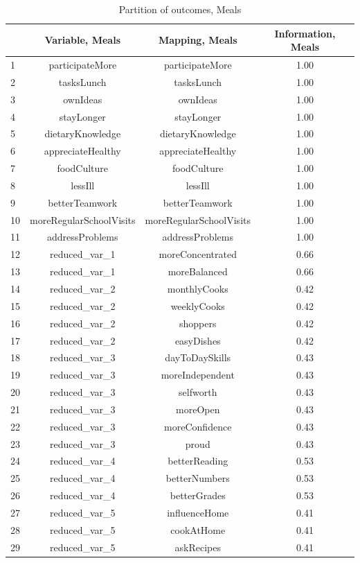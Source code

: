 \documentclass[12pt, a4paper, titlepage]{article}\usepackage[]{graphicx}\usepackage[]{color}
\begin{document}
\begin{table}[ht]
\centering
\begin{tabular}{lccc}
  \hline
 & Variable, Meals & Mapping, Meals & Information, Meals \\ 
  \hline
1 & participateMore & participateMore & 1.00 \\ 
  2 & tasksLunch & tasksLunch & 1.00 \\ 
  3 & ownIdeas & ownIdeas & 1.00 \\ 
  4 & stayLonger & stayLonger & 1.00 \\ 
  5 & dietaryKnowledge & dietaryKnowledge & 1.00 \\ 
  6 & appreciateHealthy & appreciateHealthy & 1.00 \\ 
  7 & foodCulture & foodCulture & 1.00 \\ 
  8 & lessIll & lessIll & 1.00 \\ 
  9 & betterTeamwork & betterTeamwork & 1.00 \\ 
  10 & moreRegularSchoolVisits & moreRegularSchoolVisits & 1.00 \\ 
  11 & addressProblems & addressProblems & 1.00 \\ 
  12 & reduced\_var\_1 & moreConcentrated & 0.66 \\ 
  13 & reduced\_var\_1 & moreBalanced & 0.66 \\ 
  14 & reduced\_var\_2 & monthlyCooks & 0.42 \\ 
  15 & reduced\_var\_2 & weeklyCooks & 0.42 \\ 
  16 & reduced\_var\_2 & shoppers & 0.42 \\ 
  17 & reduced\_var\_2 & easyDishes & 0.42 \\ 
  18 & reduced\_var\_3 & dayToDaySkills & 0.43 \\ 
  19 & reduced\_var\_3 & moreIndependent & 0.43 \\ 
  20 & reduced\_var\_3 & selfworth & 0.43 \\ 
  21 & reduced\_var\_3 & moreOpen & 0.43 \\ 
  22 & reduced\_var\_3 & moreConfidence & 0.43 \\ 
  23 & reduced\_var\_3 & proud & 0.43 \\ 
  24 & reduced\_var\_4 & betterReading & 0.53 \\ 
  25 & reduced\_var\_4 & betterNumbers & 0.53 \\ 
  26 & reduced\_var\_4 & betterGrades & 0.53 \\ 
  27 & reduced\_var\_5 & influenceHome & 0.41 \\ 
  28 & reduced\_var\_5 & cookAtHome & 0.41 \\ 
  29 & reduced\_var\_5 & askRecipes & 0.41 \\ 
   \hline
\end{tabular}
\caption{Partition of outcomes, Meals} 
\label{partitionmeals}
\end{table}
\end{document}
